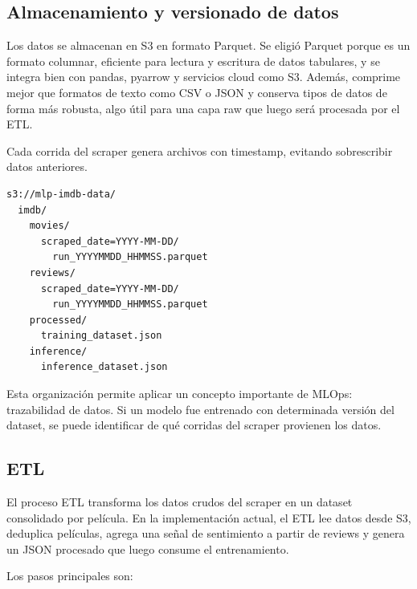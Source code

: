 \documentclass[letterpaper,12pt]{article}
\begin{document}
\subsection{Almacenamiento y versionado de datos}

Los datos se almacenan en S3 en formato Parquet. Se eligió Parquet porque es un formato columnar, eficiente para lectura y escritura de datos tabulares, y se integra bien con pandas, pyarrow y servicios cloud como S3. Además, comprime mejor que formatos de texto como CSV o JSON y conserva tipos de datos de forma más robusta, algo útil para una capa raw que luego será procesada por el ETL.

Cada corrida del scraper genera archivos con timestamp, evitando sobrescribir datos anteriores.

\begin{lstlisting}
s3://mlp-imdb-data/
  imdb/
    movies/
      scraped_date=YYYY-MM-DD/
        run_YYYYMMDD_HHMMSS.parquet
    reviews/
      scraped_date=YYYY-MM-DD/
        run_YYYYMMDD_HHMMSS.parquet
    processed/
      training_dataset.json
    inference/
      inference_dataset.json
\end{lstlisting}

Esta organización permite aplicar un concepto importante de MLOps: trazabilidad de datos. Si un modelo fue entrenado con determinada versión del dataset, se puede identificar de qué corridas del scraper provienen los datos.

\subsection{ETL}

El proceso ETL transforma los datos crudos del scraper en un dataset consolidado por película. En la implementación actual, el ETL lee datos desde S3, deduplica películas, agrega una señal de sentimiento a partir de reviews y genera un JSON procesado que luego consume el entrenamiento.

Los pasos principales son:
\end{document}
